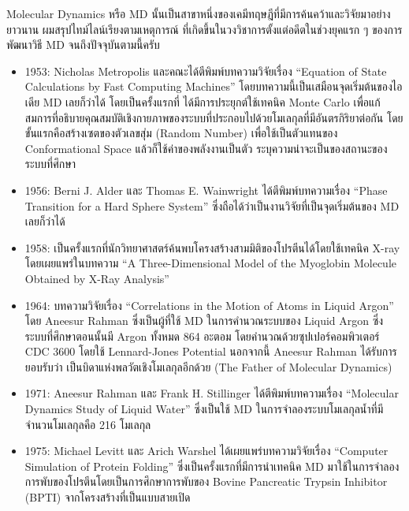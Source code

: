 Molecular Dynamics หรือ MD นั้นเป็นสาขาหนึ่งของเคมีทฤษฎีที่มีการค้นคว้าและวิจัยมาอย่างยาวนาน ผมสรุปไทม์ไลน์เรียงตามเหตุการณ์%
ที่เกิดขึ้นในวงวิชาการตั้งแต่อดีตในช่วงยุคแรก ๆ ของการพัฒนาวิธี MD จนถึงปัจจุบันตามนี้ครับ

\begin{itemize}[topsep=0pt,noitemsep]
  \setlength\itemsep{0.5em}
  \item 1953: Nicholas Metropolis และคณะได้ตีพิมพ์บทความวิจัยเรื่อง \enquote{Equation of State Calculations by Fast
          Computing Machines}\autocite{metropolis1953} โดยบทความนี้เป็นเสมือนจุดเริ่มต้นของไอเดีย MD เลยก็ว่าได้ โดยเป็นครั้งแรกที่%
        ได้มีการประยุกต์ใช้เทคนิค Monte Carlo เพื่อแก้สมการที่อธิบายคุณสมบัติเชิงกายภาพของระบบที่ประกอบไปด้วยโมเลกุลที่มีอันตรกิริยาต่อกัน
        โดยขั้นแรกคือสร้างเซตของตัวเลขสุ่ม (Random Number) เพื่อใช้เป็นตัวแทนของ Conformational Space แล้วก็ใช้ค่าของพลังงานเป็นตัว%
        ระบุความน่าจะเป็นของสถานะของระบบที่ศึกษา

  \item 1956: Berni J. Alder และ Thomas E. Wainwright ได้ตีพิมพ์บทความเรื่อง \enquote{Phase Transition for a Hard
          Sphere System}\autocite{alder1957} ซึ่งถือได้ว่าเป็นงานวิจัยที่เป็นจุดเริ่มต้นของ MD เลยก็ว่าได้

  \item 1958: เป็นครั้งแรกที่นักวิทยาศาสตร์ค้นพบโครงสร้างสามมิติของโปรตีนได้โดยใช้เทคนิค X-ray โดยเผยแพร่ในบทความ
        \enquote{A Three-Dimensional Model of the Myoglobin Molecule Obtained by X-Ray Analysis}\autocite{kendrew1958}

  \item 1964: บทความวิจัยเรื่อง \enquote{Correlations in the Motion of Atoms in Liquid Argon}\autocite{rahman1964}
        โดย Aneesur Rahman ซึ่งเป็นผู้ที่ใช้ MD ในการคำนวณระบบของ Liquid Argon ซึ่งระบบที่ศึกษาตอนนั้นมี Argon ทั้งหมด 864 อะตอม
        โดยคำนวณด้วยซุปเปอร์คอมพิวเตอร์  CDC 3600 โดยใช้ Lennard-Jones Potential นอกจากนี้ Aneesur Rahman ได้รับการยอบรับว่า%
        เป็นบิดาแห่งพลวัตเชิงโมเลกุลอีกด้วย (The Father of Molecular Dynamics)

  \item 1971: Aneesur Rahman และ Frank H. Stillinger ได้ตีพิมพ์บทความเรื่อง \enquote{Molecular Dynamics Study of
          Liquid Water}\autocite{rahman1971} ซึ่งเป็นใช้ MD ในการจำลองระบบโมเลกุลน้ำที่มีจำนวนโมเลกุลคือ 216 โมเลกุล

  \item 1975: Michael Levitt และ Arich Warshel ได้เผยแพร่บทความวิจัยเรื่อง \enquote{Computer Simulation of Protein
          Folding}\autocite{levitt1975} ซึ่งเป็นครั้งแรกที่มีการนำเทคนิค MD มาใช้ในการจำลองการพับของโปรตีนโดยเป็นการศึกษาการพับของ
        Bovine Pancreatic Trypsin Inhibitor (BPTI) จากโครงสร้างที่เป็นแบบสายเปิด


\end{itemize}
